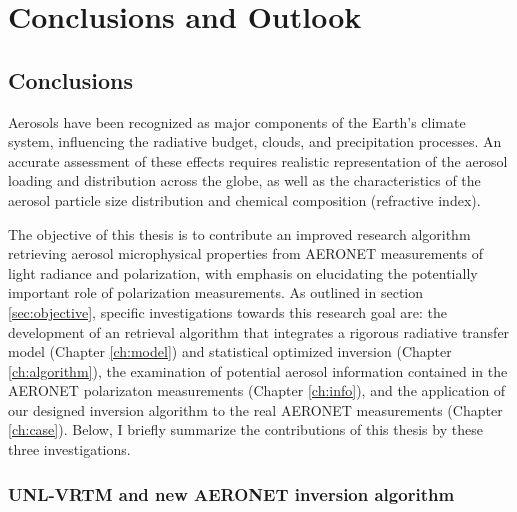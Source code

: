 \chapter{Conclusions and Outlook} \label{ch:summary}

\section{Conclusions}

Aerosols have been recognized as major components of the Earth's climate 
system, influencing the radiative budget, clouds, and precipitation processes.
An accurate assessment of these effects requires realistic representation of
the aerosol loading and distribution across the globe, as well as the
characteristics of the aerosol particle size distribution and 
chemical composition (refractive index). 

The objective of this thesis is to
contribute an improved research algorithm retrieving aerosol microphysical
properties from AERONET measurements of light radiance and polarization, with
emphasis on elucidating the potentially important role of polarization
measurements. As outlined in section \ref{sec:objective}, specific 
investigations towards this research goal are: the development of an retrieval
algorithm that integrates a rigorous radiative transfer model 
(Chapter \ref{ch:model}) and statistical optimized inversion
(Chapter \ref{ch:algorithm}), the examination
of potential aerosol information contained in the AERONET polarizaton
measurements (Chapter \ref{ch:info}), and the application of our designed
inversion algorithm to the real AERONET measurements (Chapter \ref{ch:case}).
Below, I briefly summarize the contributions of this thesis by these three
investigations.
 
\subsection{UNL-VRTM and new AERONET inversion algorithm}

